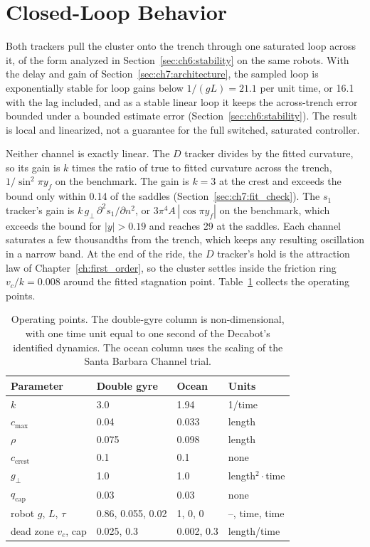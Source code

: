 \section{Closed-Loop Behavior}
\label{sec:ch7:closed_loop}

Both trackers pull the cluster onto the trench through one saturated loop
across it, of the form analyzed in Section~\ref{sec:ch6:stability} on the same robots. With the
delay and gain of Section~\ref{sec:ch7:architecture}, the sampled loop is
exponentially stable for loop gains below $1/(gL) = 21.1$ per unit
time, or 16.1 with the lag included, and as a stable linear loop it
keeps the across-trench error bounded under a bounded estimate error
(Section~\ref{sec:ch6:stability}). The result is local and linearized, not a guarantee for the
full switched, saturated controller.

Neither channel is exactly linear. The $D$ tracker divides by the fitted
curvature, so its gain is $k$ times the ratio of true to fitted curvature
across the trench, $1/\sin^2\pi y_f$ on the benchmark. The gain is
$k = 3$ at the crest and exceeds the bound only within 0.14 of the
saddles (Section~\ref{sec:ch7:fit_check}). The $s_1$ tracker's gain is
$k\,g_\perp\,\partial^2 s_1/\partial n^2$, or $3\pi^4 A\,|\cos\pi y_f|$
on the benchmark, which exceeds the bound for $|y| > 0.19$ and
reaches 29 at the saddles. Each channel saturates a few thousandths
from the trench, which keeps any resulting oscillation in a narrow band.
At the end of the ride, the $D$ tracker's hold is the
attraction law of Chapter~\ref{ch:first_order}, so the cluster settles inside the friction
ring $v_c/k = 0.008$ around the fitted stagnation point.
Table~\ref{tab:ch7:params} collects the operating points.

\begin{table}[htbp]
\caption{Operating points. The double-gyre column is non-dimensional,
with one time unit equal to one second of the Decabot's identified
dynamics. The ocean column uses the scaling of the Santa Barbara Channel
trial.}
\label{tab:ch7:params}
\centering
\begin{tabular}{llll}
\hline
Parameter & Double gyre & Ocean & Units \\
\hline
$k$                     & 3.0   & 1.94   & 1/time \\
$c_{\max}$              & 0.04  & 0.033  & length \\
$\rho$                  & 0.075 & 0.098  & length \\
$c_{\mathrm{crest}}$    & 0.1   & 0.1    & none \\
$g_\perp$               & 1.0   & 1.0    & length$^2\cdot$time \\
$q_{\mathrm{cap}}$      & 0.03  & 0.03   & none \\
robot $g$, $L$, $\tau$   & 0.86, 0.055, 0.02 & 1, 0, 0 & --, time, time \\
dead zone $v_c$, cap     & 0.025, 0.3 & 0.002, 0.3 & length/time \\
\hline
\end{tabular}
\end{table}

